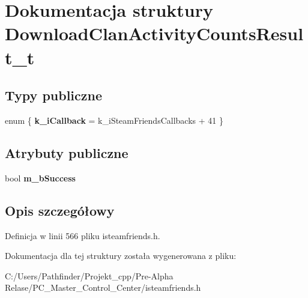 \hypertarget{struct_download_clan_activity_counts_result__t}{}\section{Dokumentacja struktury Download\+Clan\+Activity\+Counts\+Result\+\_\+t}
\label{struct_download_clan_activity_counts_result__t}
\subsection*{Typy publiczne}
\begin{DoxyCompactItemize}
\item 
\mbox{\label{struct_download_clan_activity_counts_result__t_a51c44f6532146f728a317f6650567178}} 
enum \{ {\bfseries k\+\_\+i\+Callback} = k\+\_\+i\+Steam\+Friends\+Callbacks + 41
 \}
\end{DoxyCompactItemize}
\subsection*{Atrybuty publiczne}
\begin{DoxyCompactItemize}
\item 
\mbox{\label{struct_download_clan_activity_counts_result__t_ac3c10df91d31ff62f3fc79abee3e4113}} 
bool {\bfseries m\+\_\+b\+Success}
\end{DoxyCompactItemize}


\subsection{Opis szczegółowy}


Definicja w linii 566 pliku isteamfriends.\+h.



Dokumentacja dla tej struktury została wygenerowana z pliku\+:\begin{DoxyCompactItemize}
\item 
C\+:/\+Users/\+Pathfinder/\+Projekt\+\_\+cpp/\+Pre-\/\+Alpha Relase/\+P\+C\+\_\+\+Master\+\_\+\+Control\+\_\+\+Center/isteamfriends.\+h\end{DoxyCompactItemize}
